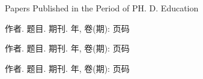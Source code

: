 
{} {Papers
Published in the Period of PH. D. Education}

\begin{publist}
\item 作者. 题目. 期刊. 年, 卷(期): 页码

\item 作者. 题目. 期刊. 年, 卷(期): 页码

\item 作者. 题目. 期刊. 年, 卷(期): 页码
\end{publist}
